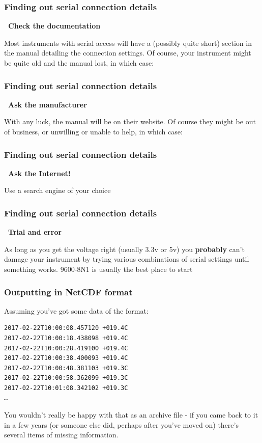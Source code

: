 \documentclass[aspectratio=1610,9pt]{beamer} %
\newcommand\myheading[1]{%
  \par\bigskip
  {\Large\bfseries\center~#1}\par\smallskip}
\begin{document}
\begin{frame}
\frametitle{Finding out serial connection details}

\myheading{Check the documentation}

Most instruments with serial access will have a (possibly quite short)
section in the manual detailing the connection settings. Of course, your
instrument might be quite old and the manual lost, in which case:
\end{frame}
\begin{frame}
\frametitle{Finding out serial connection details}

\myheading{Ask the manufacturer}

With any luck, the manual will be on their website. Of course they might
be out of business, or unwilling or unable to help, in which case:

\end{frame}
\begin{frame}
\frametitle{Finding out serial connection details}
\myheading{Ask the Internet!}

Use a search engine of your choice

\end{frame}
\begin{frame}
\frametitle{Finding out serial connection details}
\myheading{Trial and error}

As long as you get the voltage right (usually 3.3v or 5v) you
\textbf{probably} can't damage your instrument by trying various
combinations of serial settings until something works. 9600-8N1 is
usually the best place to start

\end{frame}
\begin{frame}[fragile]
\frametitle{Outputting in NetCDF format}

Assuming you've got some data of the format:

\begin{verbatim}
2017-02-22T10:00:08.457120 +019.4C
2017-02-22T10:00:18.438098 +019.4C
2017-02-22T10:00:28.419100 +019.4C
2017-02-22T10:00:38.400093 +019.4C
2017-02-22T10:00:48.381103 +019.3C
2017-02-22T10:00:58.362099 +019.3C
2017-02-22T10:01:08.342102 +019.3C
…
\end{verbatim}

You wouldn't really be happy with that as an archive file - if you came
back to it in a few years (or someone else did, perhaps after you've
moved on) there's several items of missing information.

\end{frame}
\end{document}
